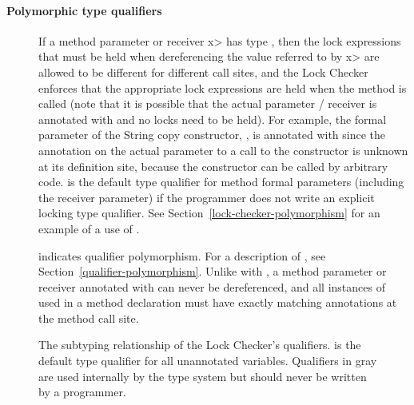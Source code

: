 \paragraph{Polymorphic type qualifiers}

\begin{description}

\item[]
  If a method parameter or receiver \<x> has type , then
  the lock expressions that must be held when
  dereferencing the value referred to by \<x> are allowed to be different
  for different call sites, and the Lock Checker
  enforces that the appropriate lock expressions are held when the method is called
  (note that it is possible that the actual parameter / receiver is annotated with
   and no locks need to be held).
  For example, the formal parameter of the String copy constructor,
  , is annotated with  since
  the  annotation
  on the actual parameter to a call to the constructor is unknown
  at its definition site, because the constructor can be called by
  arbitrary code.
   is the default type qualifier for method
  formal parameters (including the receiver parameter)
  if the programmer does not
  write an explicit locking type qualifier.
  See Section~\ref{lock-checker-polymorphism}
  for an example of a use of .

\item[]
  indicates qualifier polymorphism.  For a description of
  , see
  Section~\ref{qualifier-polymorphism}.  Unlike with ,
  a method parameter or receiver annotated with 
  can never be dereferenced, and all instances of 
  used in a method declaration must have exactly matching
   annotations at the method call site.

\end{description}

\begin{figure}
\caption{The subtyping relationship of the Lock Checker's qualifiers.
 is the default type qualifier for all unannotated
variables.
Qualifiers in gray
are used internally by the type system but should never be written by a
programmer.}
\label{fig-lock-guardedby-hierarchy}
\end{figure}

